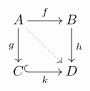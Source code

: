 \documentclass{article}
\begin{document}
$$\xymatrix{ A \ar[r]^f \ar[d]_g \ar@{.>}[dr] & B \ar[d]^h \\ C \ar@{^{(}->}[r]_k & D }$$
\end{document}
